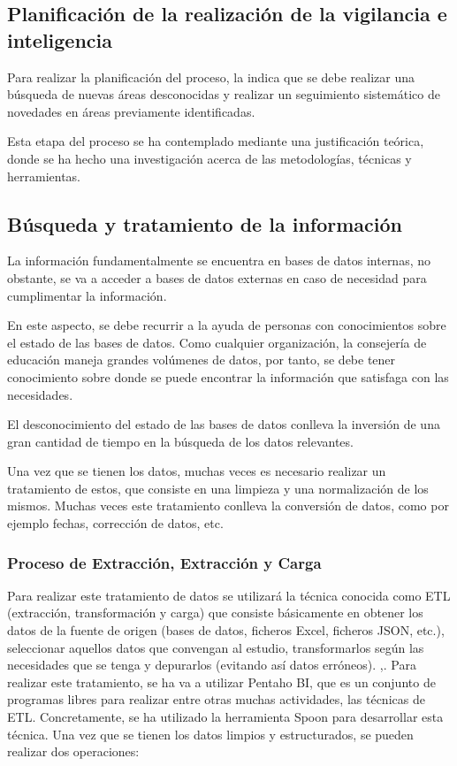 \subsection{Planificación de la realización de la vigilancia e inteligencia}
Para realizar la planificación del proceso, la  indica que se debe realizar una búsqueda de nuevas áreas desconocidas y realizar un seguimiento sistemático de novedades en áreas previamente identificadas.

Esta etapa del proceso se ha contemplado mediante una justificación teórica, donde se ha hecho una investigación acerca de las metodologías, técnicas y herramientas.

\subsection{Búsqueda y tratamiento de la información}

La información fundamentalmente se encuentra en bases de datos internas, no obstante, se va a acceder a bases de datos externas en caso de necesidad para cumplimentar la información. 

En este aspecto, se debe recurrir a la ayuda de personas con conocimientos sobre el estado de las bases de datos. Como cualquier organización, la consejería de educación maneja grandes volúmenes de datos, por tanto, se debe tener conocimiento sobre donde se puede encontrar la información que satisfaga con las necesidades. 

El desconocimiento del estado de las bases de datos conlleva la inversión de una gran cantidad de tiempo en la búsqueda de los datos relevantes. 

Una vez que se tienen los datos, muchas veces es necesario realizar un tratamiento de estos, que consiste en una limpieza y una normalización de los mismos. Muchas veces este tratamiento conlleva la conversión de datos, como por ejemplo fechas, corrección de datos, etc.

\subsubsection{Proceso de Extracción, Extracción y Carga}

Para realizar este tratamiento de datos se utilizará la técnica conocida como ETL (extracción, transformación y carga) que consiste básicamente en obtener los datos de la fuente de origen (bases de datos, ficheros Excel, ficheros JSON, etc.), seleccionar aquellos datos que convengan al estudio, transformarlos según las necesidades que se tenga y depurarlos (evitando así datos erróneos). \cite{prakash2017etl} \cite{matos2006metodologia},\cite{gour2010improve}.
Para realizar este tratamiento, se ha va a utilizar Pentaho BI, que es un conjunto de programas libres para realizar entre otras muchas actividades, las técnicas de ETL. Concretamente, se ha utilizado la herramienta Spoon para desarrollar esta técnica. 
Una vez que se tienen los datos limpios y estructurados, se pueden realizar dos operaciones:

